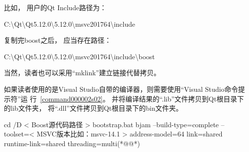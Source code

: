 比如，
用户的Qt Include路径为：
\begin{littlelongworld}
C:\textbackslash{}Qt\textbackslash{}Qt5.12.0\textbackslash{}5.12.0\textbackslash{}msvc2017\underline{\hspace{0.5em}}64\textbackslash{}include
\end{littlelongworld}
\hspace*{\parindent}复制完boost之后，
应当存在路径：
\begin{littlelongworld}
C:\textbackslash{}Qt\textbackslash{}Qt5.12.0\textbackslash{}5.12.0\textbackslash{}msvc2017\underline{\hspace{0.5em}}64\textbackslash{}include\textbackslash{}boost
\end{littlelongworld}
\hspace*{\parindent}当然，读者也可以采用“mklink”建立链接代替拷贝。

如果读者使用的是Visual Studio自带的编译器，则需要使用“Visual Studio命令提示符”运
行\commandnumbernameone\ \ref{command000002s02}。
并将编译结果的“\raisebox{-0.35ex}{\sourcefonttwo{}*}.lib”文件拷贝到Qt根目录下的lib文件夹，
将“\raisebox{-0.35ex}{\sourcefonttwo{}*}.dll”文件拷贝到Qt根目录下的bin文件夹。

\renewcommand\thelstnumber{\ifnum\value{lstnumber}>3{\ }\else{\arabic{lstnumber}}\fi}
{}\label{command000002s02}    %
\begin{thebookfilesourceonecommand}[escapeinside={(*@}{@*)},
caption=GoodLuck,
title=\commandnumbernameone \thecommandnumber
]
cd /D < Boost源代码路径 >
bootstrap.bat
bjam --build-type=complete
     --toolset=< MSVC版本比如：msvc-14.1 >
     address-model=64
     link=shared
     runtime-link=shared
     threading=multi(*@\marginpar[\hfill\setlength\fboxsep{2pt}\fbox{\footnotesize{\kaishu\parbox{1em}{\setlength{\baselineskip}{2pt}\commandnumbernameone}}\footnotesize{\thecommandnumber}}]{\setlength\fboxsep{2pt}\fbox{\footnotesize{\kaishu\parbox{1em}{\setlength{\baselineskip}{2pt}\commandnumbernameone}}\footnotesize{\thecommandnumber}}}@*)\end{thebookfilesourceonecommand}          %
\addtocounter{lstlisting}{-1}   %

\renewcommand\thelstnumber{\arabic{lstnumber}}

